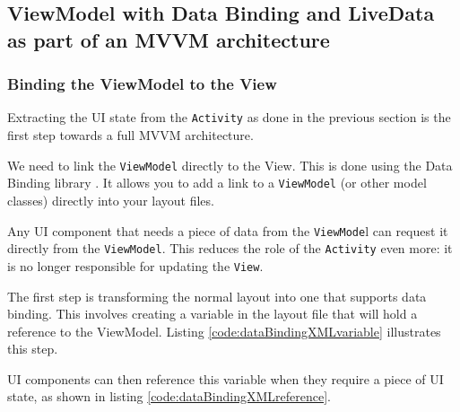 

\subsection{ViewModel with Data Binding and LiveData as part of an MVVM architecture}
\subsubsection{Binding the ViewModel to the View}

Extracting the UI state from the \lstinline!Activity! as done in the previous section is the first step towards a full MVVM architecture.


We need to link the \lstinline!ViewModel! directly to the View.
This is done using the Data Binding library \cite{dataBinding}.
It allows you to add a link to a \lstinline!ViewModel! (or other model classes) directly into your layout files.

Any UI component that needs a piece of data from the \lstinline!ViewMode!l can request it directly from the \lstinline!ViewModel!.
This reduces the role of the \lstinline!Activity! even more: it is no longer responsible for updating the \lstinline!View!.

The first step is transforming the normal layout into one that supports data binding.
This involves creating a variable in the layout file that will hold a reference to the ViewModel.
Listing \ref{code:dataBindingXMLvariable} illustrates this step.



UI components can then reference this variable when they require a piece of UI state, as shown in listing \ref{code:dataBindingXMLreference}.



